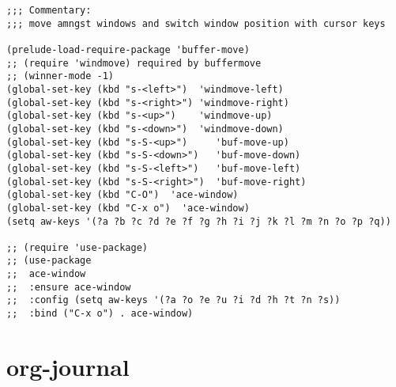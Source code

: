 \documentclass[11pt]{article}
\begin{document}
\begin{verbatim}
;;; Commentary:
;;; move amngst windows and switch window position with cursor keys

(prelude-load-require-package 'buffer-move)
;; (require 'windmove) required by buffermove
;; (winner-mode -1)
(global-set-key (kbd "s-<left>")  'windmove-left)
(global-set-key (kbd "s-<right>") 'windmove-right)
(global-set-key (kbd "s-<up>")    'windmove-up)
(global-set-key (kbd "s-<down>")  'windmove-down)
(global-set-key (kbd "s-S-<up>")     'buf-move-up)
(global-set-key (kbd "s-S-<down>")   'buf-move-down)
(global-set-key (kbd "s-S-<left>")   'buf-move-left)
(global-set-key (kbd "s-S-<right>")  'buf-move-right)
(global-set-key (kbd "C-O")  'ace-window)
(global-set-key (kbd "C-x o")  'ace-window)
(setq aw-keys '(?a ?b ?c ?d ?e ?f ?g ?h ?i ?j ?k ?l ?m ?n ?o ?p ?q))

;; (require 'use-package)
;; (use-package
;;  ace-window
;;  :ensure ace-window
;;  :config (setq aw-keys '(?a ?o ?e ?u ?i ?d ?h ?t ?n ?s))
;;  :bind ("C-x o") . ace-window)
\end{verbatim}

\section{org-journal}
\label{sec:org2cc30fe}
\end{document}
